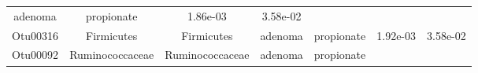 \documentclass[11pt,]{article}
\begin{document}
\begin{longtable}[]{@{}ccccccc@{}}
\begin{minipage}[t]{0.09\columnwidth}
adenoma\strut
\end{minipage} & \begin{minipage}[t]{0.11\columnwidth}\centering\strut
propionate\strut
\end{minipage} & \begin{minipage}[t]{0.09\columnwidth}\centering\strut
1.86e-03\strut
\end{minipage} & \begin{minipage}[t]{0.09\columnwidth}\centering\strut
3.58e-02\strut
\end{minipage}\tabularnewline
\begin{minipage}[t]{0.09\columnwidth}\centering\strut
Otu00316\strut
\end{minipage} & \begin{minipage}[t]{0.17\columnwidth}\centering\strut
Firmicutes\strut
\end{minipage} & \begin{minipage}[t]{0.17\columnwidth}\centering\strut
Firmicutes\strut
\end{minipage} & \begin{minipage}[t]{0.09\columnwidth}\centering\strut
adenoma\strut
\end{minipage} & \begin{minipage}[t]{0.11\columnwidth}\centering\strut
propionate\strut
\end{minipage} & \begin{minipage}[t]{0.09\columnwidth}\centering\strut
1.92e-03\strut
\end{minipage} & \begin{minipage}[t]{0.09\columnwidth}\centering\strut
3.58e-02\strut
\end{minipage}\tabularnewline
\begin{minipage}[t]{0.09\columnwidth}\centering\strut
Otu00092\strut
\end{minipage} & \begin{minipage}[t]{0.17\columnwidth}\centering\strut
Ruminococcaceae\strut
\end{minipage} & \begin{minipage}[t]{0.17\columnwidth}\centering\strut
Ruminococcaceae\strut
\end{minipage} & \begin{minipage}[t]{0.09\columnwidth}\centering\strut
adenoma\strut
\end{minipage} & \begin{minipage}[t]{0.11\columnwidth}\centering\strut
propionate\strut
\end{minipage} & \begin{minipage}[t]{0.09\columnwidth}\centering\strut

\end{minipage}
\end{longtable}
\end{document}
